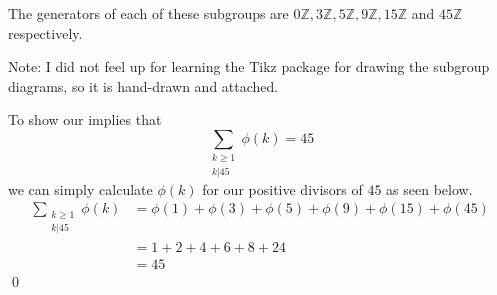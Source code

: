 \documentclass{article}
\begin{document}
The generators of each of these subgroups are $0\mathbb{Z}, 3\mathbb{Z}, 5\mathbb{Z}, 9\mathbb{Z}, 15\mathbb{Z}$ and $45\mathbb{Z}$ respectively.

Note: I did not feel up for learning the Tikz package for drawing the subgroup diagrams, so it is hand-drawn and attached.

To show our implies that 
$$\sum\limits_{\substack{k \geq 1 \\ k \rvert 45}} \phi(k) = 45$$ we can simply calculate $\phi(k)$ for our positive divisors of $45$ as seen below.
\begin{align*}
	\sum\limits_{\substack{k \geq 1 \\ k \rvert 45}} \phi(k) &= \phi(1) + \phi(3) + \phi(5) + \phi(9) + \phi(15) + \phi(45) \\
	&= 1 + 2 + 4 + 6 + 8 + 24 \\
	&= 45
\end{align*} 
\qed \\
\end{document}

